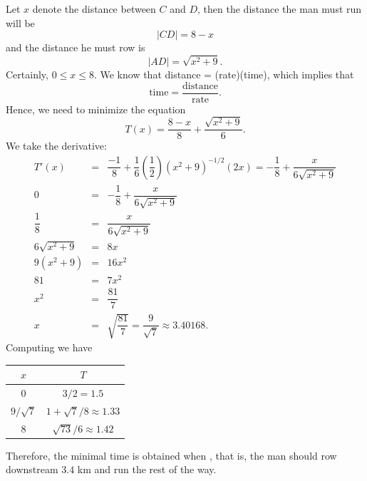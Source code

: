 \documentclass{book}
\begin{document}
\begin{Exam}
Let $x$ denote the distance between $C$ and $D$, then the distance the man must run will be 
\[|CD| = 8-x\] and the distance he must row is 
\[|AD| = \sqrt{x^2+9}.\] Certainly, $0 \le x \le 8$. We know that distance = (rate)(time), which implies that 
\[\text{time} = \dfrac{\text{distance}}{\text{rate}}.\] Hence, we need to minimize the equation 
\[T(x) = \dfrac{8-x}{8} + \dfrac{\sqrt{x^2+9}}{6}.\] We take the derivative:
\begin{eqnarray*}
T'(x) &=& \dfrac{-1}{8} + \dfrac{1}{6}\left(\dfrac{1}{2}\right)(x^2+9)^{-1/2}(2x) = -\dfrac{1}{8} + \dfrac{x}{6\sqrt{x^2+9}}\\
0 &=& -\dfrac{1}{8} + \dfrac{x}{6\sqrt{x^2+9}}\\
\dfrac{1}{8} &=& \dfrac{x}{6\sqrt{x^2+9}}\\
6\sqrt{x^2+9} &=& 8 x\\
9(x^2+9) &=& 16x^2\\
81 &=& 7x^2\\
x^2 &=& \dfrac{81}{7}\\
x &=& \sqrt{\dfrac{81}{7}} = \dfrac{9}{\sqrt{7}} \approx 3.40168.
\end{eqnarray*}
Computing we have\vspace{-10pt}
\begin{center}
\begin{tabular}{c|c}
$x$ & $T$ \\ \hline
0 & $3/2=1.5$ \\ 
$9/\sqrt{7}$ & $1+\sqrt{7}/8 \approx 1.33$ \\ 
8 & $\sqrt{73}/6 \approx 1.42$ \\ 
\end{tabular}
\end{center}
Therefore, the minimal time is obtained when , that is, the man should row downstream $3.4$ km and run the rest of the way. 
\end{Exam}\vs
\end{document}
